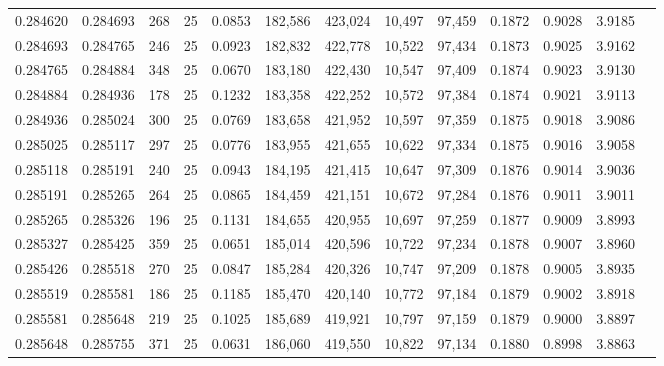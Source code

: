 \begin{tabular}{rrrrrrrrrrrrr}
0.284620 & 0.284693 &   268 &  25 &                                     0.0853 & 182,586 & 423,024 &  10,497 &  97,459 & 0.1872 & 0.9028 & 3.9185 \\
0.284693 & 0.284765 &   246 &  25 &                                     0.0923 & 182,832 & 422,778 &  10,522 &  97,434 & 0.1873 & 0.9025 & 3.9162 \\
0.284765 & 0.284884 &   348 &  25 &                                     0.0670 & 183,180 & 422,430 &  10,547 &  97,409 & 0.1874 & 0.9023 & 3.9130 \\
0.284884 & 0.284936 &   178 &  25 &                                     0.1232 & 183,358 & 422,252 &  10,572 &  97,384 & 0.1874 & 0.9021 & 3.9113 \\
0.284936 & 0.285024 &   300 &  25 &                                     0.0769 & 183,658 & 421,952 &  10,597 &  97,359 & 0.1875 & 0.9018 & 3.9086 \\
0.285025 & 0.285117 &   297 &  25 &                                     0.0776 & 183,955 & 421,655 &  10,622 &  97,334 & 0.1875 & 0.9016 & 3.9058 \\
0.285118 & 0.285191 &   240 &  25 &                                     0.0943 & 184,195 & 421,415 &  10,647 &  97,309 & 0.1876 & 0.9014 & 3.9036 \\
0.285191 & 0.285265 &   264 &  25 &                                     0.0865 & 184,459 & 421,151 &  10,672 &  97,284 & 0.1876 & 0.9011 & 3.9011 \\
0.285265 & 0.285326 &   196 &  25 &                                     0.1131 & 184,655 & 420,955 &  10,697 &  97,259 & 0.1877 & 0.9009 & 3.8993 \\
0.285327 & 0.285425 &   359 &  25 &                                     0.0651 & 185,014 & 420,596 &  10,722 &  97,234 & 0.1878 & 0.9007 & 3.8960 \\
0.285426 & 0.285518 &   270 &  25 &                                     0.0847 & 185,284 & 420,326 &  10,747 &  97,209 & 0.1878 & 0.9005 & 3.8935 \\
0.285519 & 0.285581 &   186 &  25 &                                     0.1185 & 185,470 & 420,140 &  10,772 &  97,184 & 0.1879 & 0.9002 & 3.8918 \\
0.285581 & 0.285648 &   219 &  25 &                                     0.1025 & 185,689 & 419,921 &  10,797 &  97,159 & 0.1879 & 0.9000 & 3.8897 \\
0.285648 & 0.285755 &   371 &  25 &                                     0.0631 & 186,060 & 419,550 &  10,822 &  97,134 & 0.1880 & 0.8998 & 3.8863 \\

\end{tabular}
